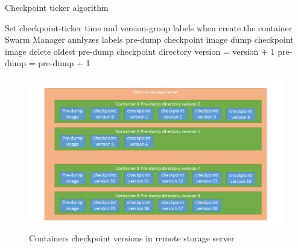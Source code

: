 \begin{algorithm}[h]
    \caption{Checkpoint ticker algorithm}
    \begin{algorithmic}[1]
        \State Set checkpoint-ticker time and version-group labels when create the container
        \State Swarm Manager annlyzes labels
        \label{code:checkpointTicker}
                \State pre-dump checkpoint image
            \EndIf
            \State dump checkpoint image
                \State delete oldest pre-dump checkpoint directory
            \EndIf
            \State version = version + 1
                \State pre-dump = pre-dump + 1
            \EndIf
        \EndWhile
    \end{algorithmic}
\end{algorithm}

\begin{figure}[h]
\begin{center}
\includegraphics[width=15cm]{figure/checkpoint_demo.png}
\end{center}
\caption{Containers checkpoint versions in remote storage server}
\label{fig:Containers checkpoint versions in remote storage server}
\end{figure}

